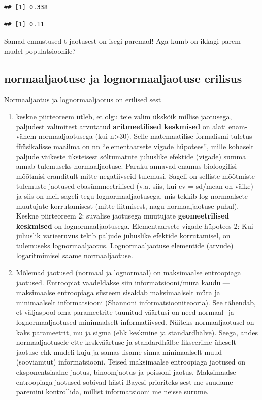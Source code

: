 \documentclass[]{book}
\begin{document}
\begin{verbatim}
## [1] 0.338
\end{verbatim}

\begin{verbatim}
## [1] 0.11
\end{verbatim}

Samad ennustused t jaotusest on isegi paremad! Aga kumb on ikkagi parem
mudel populatsioonile?

\subsection{normaaljaotuse ja lognormaaljaotuse
erilisus}\label{normaaljaotuse-ja-lognormaaljaotuse-erilisus}

Normaaljaotus ja lognormaaljaotus on erilised sest

\begin{enumerate}
\def\labelenumi{(\arabic{enumi})}
\item
  keskne piirteoreem ütleb, et olgu teie valim ükskõik millise
  jaotusega, paljudest valimitest arvutatud \textbf{aritmeetilised
  keskmised} on alati enam-vähem normaaljaotusega (kui
  n\textgreater{}30). Selle matemaatilise formalismi tuletus
  füüsikalisse maailma on nn ``elementaarsete vigade hüpotees'', mille
  kohaselt paljude väikeste üksteisest sõltumatute juhuslike efektide
  (vigade) summa annab tulemuseks normaaljaotuse. Paraku annavad enamus
  bioloogilisi mõõtmisi eranditult mitte-negatiivseid tulemusi. Sageli
  on selliste mõõtmiste tulemuste jaotused ebasümmeetrilised (v.a. siis,
  kui cv = sd/mean on väike) ja siis on meil sageli tegu
  lognormaaljaotusega, mis tekkib log-normaalsete muutujate
  korrutamisest (mitte liitmisest, nagu normaaljaotuse puhul). Keskne
  piirteoreem 2: suvalise jaotusega muutujate \textbf{geomeetrilised
  keskmised} on lognormaaljaotusega. Elementaarsete vigade hüpotees 2:
  Kui juhuslik varieeruvus tekib paljude juhuslike efektide
  korrutamisel, on tulemuseks lognormaaljaotus. Lognormaaljaotuse
  elementide (arvude) logaritmimisel saame normaaljaotuse.
\item
  Mõlemad jaotused (normaal ja lognormaal) on maksimaalse entroopiaga
  jaotused. Entroopiat vaadeldakse siin informatsiooni/müra kaudu ---
  maksimaalse entroopiaga süsteem sisaldab maksimaalselt müra ja
  minimaalselt informatsiooni (Shannoni informatsiooniteooria). See
  tähendab, et väljaspool oma parameetrite tuunitud väärtusi on need
  normaal- ja lognormaaljaotused minimaalselt informatiivsed. Näiteks
  normaaljaotusel on kaks parameetrit, mu ja sigma (ehk keskmine ja
  standardhälve). Seega, andes normaaljaotusele ette keskväärtuse ja
  standardhälbe fikseerime üheselt jaotuse ehk mudeli kuju ja samas
  lisame sinna minimaalselt muud (sooviamtut) informatsiooni. Teised
  maksimaalse entroopiaga jaotused on eksponentsiaalne jaotus,
  binoomjaotus ja poissoni jaotus. Maksimaalse entroopiaga jaotused
  sobivad hästi Bayesi prioriteks sest me suudame paremini kontrollida,
  millist informatsiooni me neisse surume.
\end{enumerate}
\end{document}
